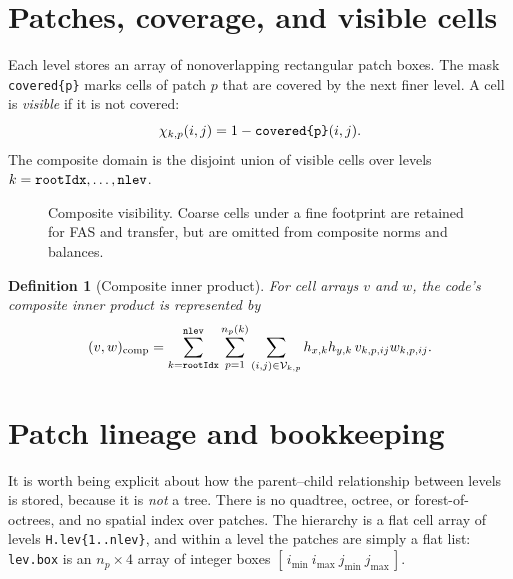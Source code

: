\documentclass[11pt,oneside,openany]{book}
\newcommand{\code}[1]{\textnormal{\texttt{#1}}}
\newcommand{\vis}{\mathcal{V}}
\newtheorem{definition}{Definition}[chapter]
\begin{document}
\section{Patches, coverage, and visible cells}
Each level stores an array of nonoverlapping rectangular patch boxes. The mask \code{covered\{p\}} marks cells of patch $p$ that are covered by the next finer level. A cell is \emph{visible} if it is not covered:
\[
  \chi_{k,p}(i,j)=1-\code{covered\{p\}}(i,j).
\]
The composite domain is the disjoint union of visible cells over levels $k=\code{rootIdx},\ldots,\code{nlev}$.

\begin{figure}[htbp]
\centering
{}
\caption{Composite visibility. Coarse cells under a fine footprint are retained for FAS and transfer, but are omitted from composite norms and balances.}
\label{fig:visiblecells}
\end{figure}

\begin{definition}[Composite inner product]
For cell arrays $v$ and $w$, the code's composite inner product is represented by
\[
  (v,w)_{\mathrm{comp}}
  =\sum_{k=\code{rootIdx}}^{\code{nlev}}
    \sum_{p=1}^{n_p(k)}
    \sum_{(i,j)\in\vis_{k,p}}
    h_{x,k}h_{y,k}\,v_{k,p,ij}w_{k,p,ij}.
\]
\end{definition}

\section{Patch lineage and bookkeeping}
\label{sec:lineage}
It is worth being explicit about how the parent--child relationship between levels is stored, because it is \emph{not} a tree. There is no quadtree, octree, or forest-of-octrees, and no spatial index over patches. The hierarchy is a flat cell array of levels \code{H.lev\{1..nlev\}}, and within a level the patches are simply a flat list: \code{lev.box} is an $n_p\times4$ array of integer boxes $[\,i_{\min}\ i_{\max}\ j_{\min}\ j_{\max}\,]$.
\end{document}
